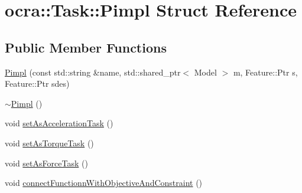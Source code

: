 \hypertarget{structocra_1_1Task_1_1Pimpl}{}\section{ocra\+:\+:Task\+:\+:Pimpl Struct Reference}
\label{structocra_1_1Task_1_1Pimpl}
\subsection*{Public Member Functions}
\begin{DoxyCompactItemize}
\item 
\hyperlink{structocra_1_1Task_1_1Pimpl_a3d7faa7e6fa107d07e079823df57b07e}{Pimpl} (const std\+::string \&name, std\+::shared\+\_\+ptr$<$ Model $>$ m, Feature\+::\+Ptr s, Feature\+::\+Ptr sdes)
\item 
\hyperlink{structocra_1_1Task_1_1Pimpl_ae00df5386f25d40f820ef4bc1296ea4a}{$\sim$\+Pimpl} ()
\item 
void \hyperlink{structocra_1_1Task_1_1Pimpl_a1b06484c1ce60c68a20df0369bdb8221}{set\+As\+Acceleration\+Task} ()
\item 
void \hyperlink{structocra_1_1Task_1_1Pimpl_ab5bfb5126aa62de5e77c49c65711f0c2}{set\+As\+Torque\+Task} ()
\item 
void \hyperlink{structocra_1_1Task_1_1Pimpl_a6591dc9a28cc7cc30473559600bf5cb6}{set\+As\+Force\+Task} ()
\item 
void \hyperlink{structocra_1_1Task_1_1Pimpl_aabf390e84dff086a53ea876fad5755c5}{connect\+Functionn\+With\+Objective\+And\+Constraint} ()
\end{DoxyCompactItemize}
